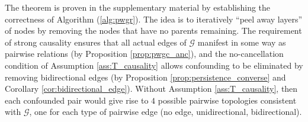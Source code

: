 \documentclass{statsoc}
\def\gcg{\mathcal{G}}  %
\begin{document}
The theorem is proven in the supplementary material by establishing
the correctness of Algorithm (\ref{alg:pwgr}).  The idea is to
iteratively ``peel away layers'' of nodes by removing the nodes that
have no parents remaining.  The requirement of strong causality
ensures that all actual edges of $\gcg$ manifest in some way as
pairwise relations (by Proposition \ref{prop:pwgc_anc}), and the
no-cancellation condition of Assumption \ref{ass:T_causality} allows
confounding to be eliminated by removing bidirectional edges (by
Proposition \ref{prop:persistence_converse} and Corollary
\ref{cor:bidirectional_edge}).  Without Assumption
\ref{ass:T_causality}, then each confounded pair would give rise to
$4$ possible pairwise topologies consistent with $\gcg$, one for each
type of pairwise edge (no edge, unidirectional, bidirectional).
\end{document}
